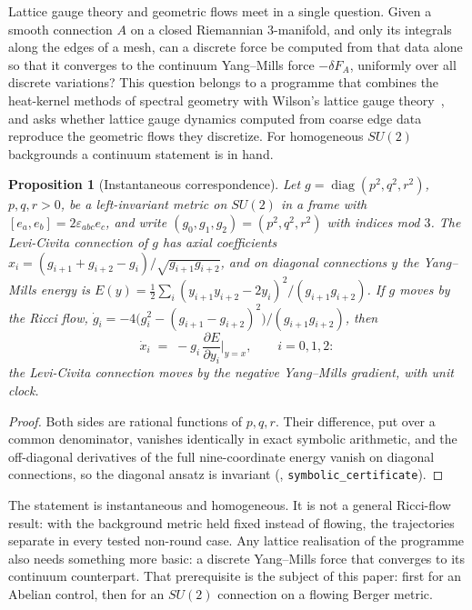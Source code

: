 \documentclass[11pt]{article}
\newtheorem{proposition}[theorem]{Proposition}
\theoremstyle{definition}
\theoremstyle{remark}
\begin{document}
Lattice gauge theory and geometric flows meet in a single question. Given a smooth
connection $A$ on a closed Riemannian $3$-manifold, and only its integrals along the edges
of a mesh, can a discrete force be computed from that data alone so that it converges to
the continuum Yang--Mills force $-\delta F_A$, uniformly over all discrete variations?
This question belongs to a programme that combines the heat-kernel methods of spectral
geometry with Wilson's lattice gauge theory~\cite{wilson1974}, and asks whether lattice gauge
dynamics computed from coarse edge data reproduce the geometric flows they discretize. For
homogeneous $SU(2)$ backgrounds a continuum statement is in hand.

\begin{proposition}[Instantaneous correspondence]\label{prop:corr}
Let $g=\operatorname{diag}(p^2,q^2,r^2)$, $p,q,r>0$, be a left-invariant metric on $SU(2)$ in a frame
with $[e_a,e_b]=2\varepsilon_{abc}e_c$, and write $(g_0,g_1,g_2)=(p^2,q^2,r^2)$ with indices mod $3$.
The Levi-Civita connection of $g$ has axial coefficients
$x_i=(g_{i+1}+g_{i+2}-g_i)/\sqrt{g_{i+1}g_{i+2}}$, and on diagonal connections $y$ the Yang--Mills
energy is $E(y)=\tfrac12\sum_i(y_{i+1}y_{i+2}-2y_i)^2/(g_{i+1}g_{i+2})$. If $g$ moves by the Ricci
flow, $\dot g_i=-4\bigl(g_i^2-(g_{i+1}-g_{i+2})^2\bigr)/(g_{i+1}g_{i+2})$, then
\[
  \dot x_i \;=\; -g_i\,\frac{\partial E}{\partial y_i}\Big|_{y=x},\qquad i=0,1,2:
\]
the Levi-Civita connection moves by the negative Yang--Mills gradient, with unit clock.
\end{proposition}
\begin{proof}
Both sides are rational functions of $p,q,r$. Their difference, put over a common denominator,
vanishes identically in exact symbolic arithmetic, and the off-diagonal derivatives of the full
nine-coordinate energy vanish on diagonal connections, so the diagonal ansatz is invariant
(, \texttt{symbolic\_certificate}).
\end{proof}

The statement is instantaneous and homogeneous. It is not a general Ricci-flow result: with
the background metric held fixed instead of flowing, the trajectories separate in every tested
non-round case. Any lattice realisation of the programme also needs something more basic: a discrete Yang--Mills
force that converges to its continuum counterpart. That prerequisite is the subject of
this paper: first for an Abelian control, then for an $SU(2)$ connection on a flowing
Berger metric.
\end{document}
